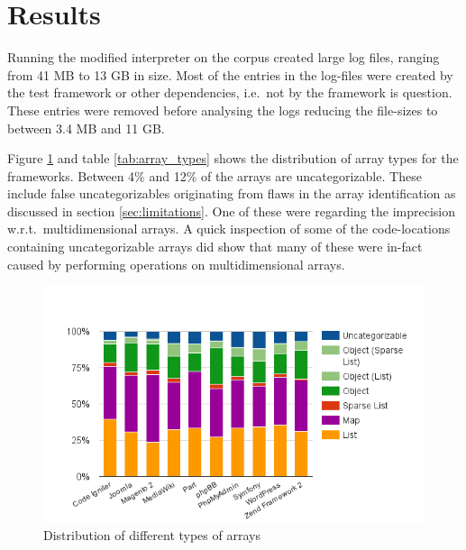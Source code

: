 \section{Results}
\label{sec:analysisResults}
Running the modified interpreter on the corpus created large log files, ranging from 41 MB to 13 GB in size. Most of the entries in the log-files were created by the test framework or other dependencies, i.e.\ not by the framework is question. These entries were removed before analysing the logs reducing the file-sizes to between 3.4 MB and 11 GB.

Figure \ref{fig:array_types} and table \ref{tab:array_types} shows the distribution of array types for the frameworks.  Between 4\% and 12\% of the arrays are uncategorizable. These include false uncategorizables originating from flaws in the array identification as discussed in section \ref{sec:limitations}. One of these were regarding the imprecision w.r.t.\ multidimensional arrays. A quick inspection of some of the code-locations containing uncategorizable arrays did show that many of these were in-fact caused by performing operations on multidimensional arrays.

\begin{figure}
\centering
\includegraphics[width=\textwidth]{chapters/study/g22.png}
\caption{Distribution of different types of arrays}
\label{fig:array_types}
\end{figure}

